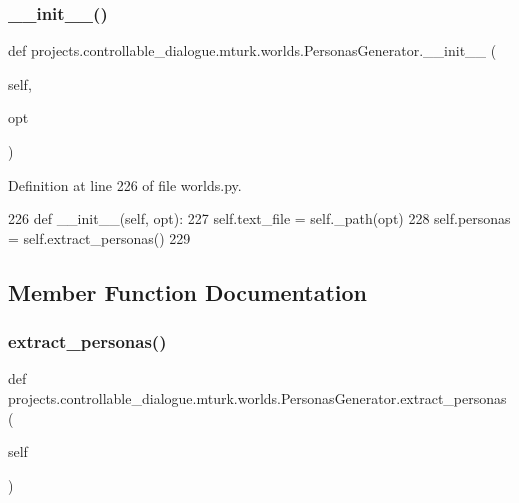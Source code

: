 \subsubsection{\texorpdfstring{\+\_\+\+\_\+init\+\_\+\+\_\+()}{\_\_init\_\_()}}
{\footnotesize\ttfamily def projects.\+controllable\+\_\+dialogue.\+mturk.\+worlds.\+Personas\+Generator.\+\_\+\+\_\+init\+\_\+\+\_\+ (\begin{DoxyParamCaption}\item[{}]{self,  }\item[{}]{opt }\end{DoxyParamCaption})}



Definition at line 226 of file worlds.\+py.


\begin{DoxyCode}
226     \textcolor{keyword}{def }\_\_init\_\_(self, opt):
227         self.text\_file = self.\_path(opt)
228         self.personas = self.extract\_personas()
229 
\end{DoxyCode}


\subsection{Member Function Documentation}
\mbox{\label{classprojects_1_1controllable__dialogue_1_1mturk_1_1worlds_1_1PersonasGenerator_aa850e152f50cbd96ea6899a830bdad10}} 
\subsubsection{\texorpdfstring{extract\+\_\+personas()}{extract\_personas()}}
{\footnotesize\ttfamily def projects.\+controllable\+\_\+dialogue.\+mturk.\+worlds.\+Personas\+Generator.\+extract\+\_\+personas (\begin{DoxyParamCaption}\item[{}]{self }\end{DoxyParamCaption})}



